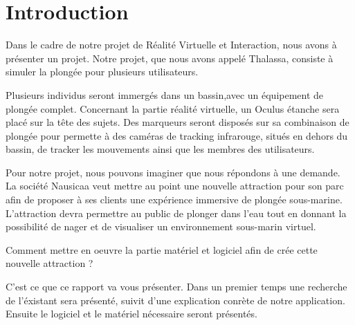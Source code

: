 \chapter{Introduction}
Dans le cadre de notre projet de Réalité Virtuelle et Interaction, nous avons à présenter un projet. Notre projet, que nous avons appelé Thalassa, consiste à simuler la plongée pour plusieurs utilisateurs.

Plusieurs individus seront immergés dans un bassin,avec un équipement de plongée complet. Concernant la partie réalité virtuelle, un Oculus étanche sera placé sur la tête des sujets. Des marqueurs seront disposés sur sa combinaison de plongée pour permette à des caméras de tracking infrarouge, situés en dehors du bassin, de tracker les mouvements ainsi que les membres des utilisateurs. 

Pour notre projet, nous pouvons imaginer que nous répondons à une demande. La société Nausicaa veut mettre au point une nouvelle attraction pour son parc afin de proposer à ses clients une expérience immersive de plongée sous-marine. L’attraction devra permettre au public de plonger dans l’eau tout en donnant la possibilité de nager et de visualiser un environnement sous-marin virtuel. 

Comment mettre en oeuvre la partie matériel et logiciel afin de crée cette nouvelle attraction ?

C'est ce que ce rapport va vous présenter. Dans un premier temps une recherche de l'éxistant sera présenté, suivit d'une explication conrète de notre application. Ensuite le logiciel et le matériel nécessaire seront présentés.
